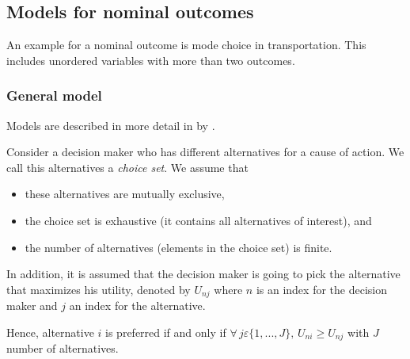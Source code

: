 	\subsection{Models for nominal outcomes}
		An example for a nominal outcome is mode choice in transportation. This includes unordered variables with more than two outcomes.
		\subsubsection{General model}
			Models are described in more detail in  by \textcite{Kennedy.2008}.
			
			Consider a decision maker who has different alternatives for a cause of action. We call this alternatives a \emph{choice set}. We assume that
			\begin{itemize}
				\item these alternatives are mutually exclusive,
				\item the choice set is exhaustive (it contains all alternatives of interest), and
				\item the number of alternatives (elements in the choice set) is finite.
			\end{itemize}
			In addition, it is assumed that the decision maker is going to pick the alternative that maximizes his utility, denoted by $U_{nj}$ where $n$ is an index for the decision maker and $j$ an index for the alternative.
			
			Hence, alternative $i$ is preferred if and only if $\forall\,j\varepsilon\{1,...,J\},\,U_{ni}\geq U_{nj}$ with $J$ number of alternatives.
			
